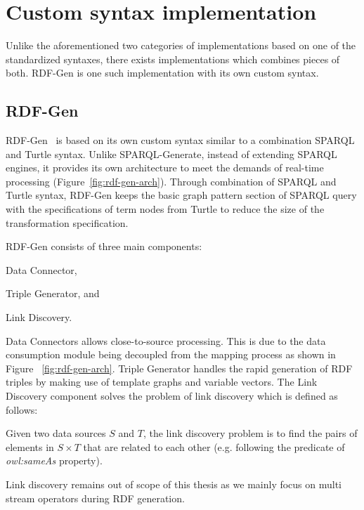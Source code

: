 \section{Custom syntax implementation}
Unlike the aforementioned two categories of implementations based on one of the
standardized syntaxes, 
there exists implementations which combines pieces of both. RDF-Gen is one such 
implementation with its own custom syntax. 

\subsection{RDF-Gen}
RDF-Gen~\cite{rdf_gen} is based on its own custom syntax 
similar to a combination SPARQL and Turtle syntax. 
Unlike SPARQL-Generate, instead of extending SPARQL engines, 
it provides its own architecture to meet the demands
of real-time processing (Figure~\ref{fig:rdf-gen-arch}). 
Through combination of SPARQL and Turtle syntax, RDF-Gen 
keeps the basic graph pattern section of SPARQL query with 
the specifications of term nodes from Turtle to reduce
the size of the transformation specification.  

RDF-Gen consists of three main components: 
\begin{enumerate*}[label=(\alph*)]
  \item Data Connector,
  \item Triple Generator, and
  \item Link Discovery.
\end{enumerate*}

Data Connectors allows close-to-source processing. This is due to the
data consumption 
module being decoupled from the mapping process as shown in Figure ~\ref{fig:rdf-gen-arch}. 
Triple Generator handles the rapid generation of RDF triples by making use of 
template graphs and variable vectors. The Link Discovery component solves the 
problem of link discovery which is defined as follows:

\begin{defn}    
Given two data sources $S$ and $T$, the link discovery problem is to
find the pairs of elements in 
$S \times T$ that are related to each other (e.g. following the predicate of 
\emph{owl:sameAs} property). 
\end{defn}

Link discovery remains out of scope of this thesis as we mainly focus on 
multi stream operators during RDF generation.


